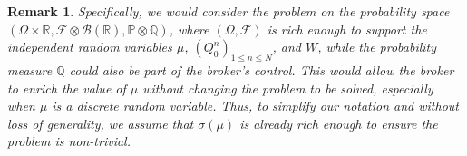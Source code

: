 \documentclass[10pt]{article}
\newtheorem{remark}[theorem]{Remark}
\def\d{\mathrm{d}}
\begin{document}
\begin{remark}\label{enlarge the space}
Specifically, we would consider the problem on the probability space 
$\left( \Omega \times \mathbb{R}, \mathcal{F} \otimes \mathcal{B}(\mathbb{R}), \mathbb{P} \otimes \mathbb{Q} \right)$, where $(\Omega, \mathcal{F})$ is rich enough to support the independent random variables $\mu$, \( (Q_0^n)_{1 \leq n \leq N} \), and \( W \), while
the probability measure \( \mathbb{Q} \) could also be part of the broker's control. This would allow the broker to enrich the value of \( \mu \) without changing the problem to be solved, especially when $\mu$ is a discrete random variable. Thus, to simplify our notation and without loss of generality, we assume that \( \sigma(\mu) \) is already rich enough to ensure the problem is non-trivial.
\end{remark}




\end{document}
